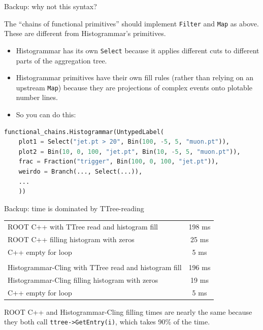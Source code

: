 \documentclass{beamer}
\begin{document}
\begin{frame}[fragile]{Backup: why not this syntax?}

\vspace{0.5 cm}

\vspace{0.2 cm}
The ``chains of functional primitives'' should implement {\tt Filter} and {\tt Map} as above. These are different from Histogrammar's primitives.

\begin{itemize}
\item Histogrammar has its own {\tt Select} because it applies different cuts to different parts of the aggregation tree.
\item Histogrammar primitives have their own fill rules (rather than relying on an upstream {\tt Map}) because they are projections of complex events onto plotable number lines.
\item So you can do this:
\end{itemize}

\begin{minipage}{1.05\linewidth}
\begin{lstlisting}[language=python, basicstyle=\ttfamily\scriptsize]
functional_chains.Histogrammar(UntypedLabel(
    plot1 = Select("jet.pt > 20", Bin(100, -5, 5, "muon.pt")),
    plot2 = Bin(10, 0, 100, "jet.pt", Bin(10, -5, 5, "muon.pt")),
    frac = Fraction("trigger", Bin(100, 0, 100, "jet.pt")),
    weirdo = Branch(..., Select(...)),
    ...
    ))
\end{lstlisting}
\end{minipage}
\end{frame}

\begin{frame}{Backup: time is dominated by TTree-reading}
\vspace{0.5 cm}
\renewcommand{\arraystretch}{1.2}
\begin{tabular}{l c}
ROOT C++ with TTree read and histogram fill & 198 ms \\
ROOT C++ filling histogram with zeros & 25 ms \\
C++ empty for loop & 5 ms \\
 & \\
Histogrammar-Cling with TTree read and histogram fill & 196 ms \\
Histogrammar-Cling filling histogram with zeros & 19 ms \\
C++ empty for loop & 5 ms \\
\end{tabular}

\vspace{1 cm}
ROOT C++ and Histogrammar-Cling filling times are nearly the same because they both call {\tt\small ttree->GetEntry(i)}, which takes 90\% of the time.
\end{frame}
\end{document}
